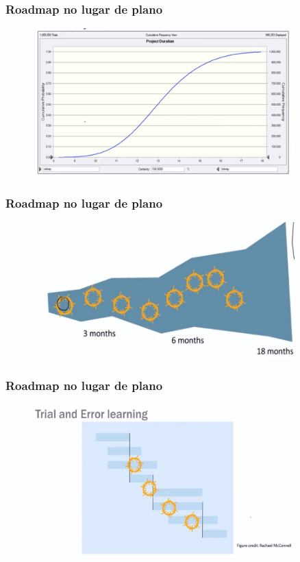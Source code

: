 \begin{frame}
 \frametitle{Roadmap no lugar de plano}
  \begin{figure}
   \centering
   \includegraphics[width = 0.9\textwidth]{figs/fig13.png}
  \end{figure}
\end{frame}

\begin{frame}
 \frametitle{Roadmap no lugar de plano}
  \begin{figure}
   \centering
   \includegraphics[width = 0.9\textwidth]{figs/fig14.png}
  \end{figure}
\end{frame}

\begin{frame}
 \frametitle{Roadmap no lugar de plano}
  \begin{figure}
   \centering
   \includegraphics[width = 0.9\textwidth]{figs/fig15.png}
  \end{figure}
\end{frame}